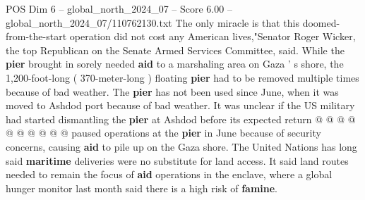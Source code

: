 \begin{textsample}{POS Dim 6 – global\_north\_2024\_07 – Score 6.00 – global\_north\_2024\_07/110762130.txt}
The only miracle is that this doomed-from-the-start operation did not cost any American lives,"Senator Roger Wicker, the top Republican on the Senate Armed Services Committee, said.
While the \textbf{pier} brought in sorely needed \textbf{aid} to a marshaling area on Gaza ' s shore, the 1,200-foot-long ( 370-meter-long ) floating \textbf{pier} had to be removed multiple times because of bad weather.
The \textbf{pier} has not been used since June, when it was moved to Ashdod port because of bad weather.
It was unclear if the US military had started dismantling the \textbf{pier} at Ashdod before its expected return @ @ @ @ @ @ @ @ @ @ paused operations at the \textbf{pier} in June because of security concerns, causing \textbf{aid} to pile up on the Gaza shore.
The United Nations has long said \textbf{maritime} deliveries were no substitute for land access.
It said land routes needed to remain the focus of \textbf{aid} operations in the enclave, where a global hunger monitor last month said there is a high risk of \textbf{famine}.

\end{textsample}
